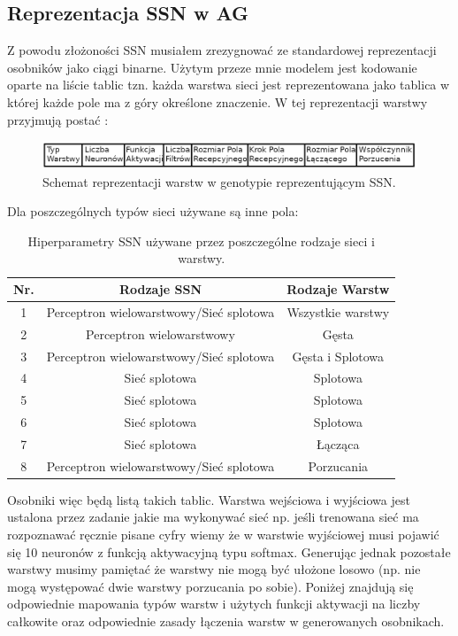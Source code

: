 \documentclass{article}
\begin{document}
\subsection{Reprezentacja SSN w AG}
\label{sec:ossn}
Z powodu złożoności SSN musiałem zrezygnować ze standardowej reprezentacji osobników 
jako ciągi binarne. Użytym przeze mnie modelem jest kodowanie oparte na liście tablic tzn.
każda warstwa sieci jest reprezentowana jako tablica w której każde pole ma z góry określone 
znaczenie. W tej reprezentacji warstwy przyjmują postać \cite{ams}:\\
\begin{figure}[H]
\centering
\includegraphics[scale=0.30]{dnn_genome.png}
\caption{Schemat reprezentacji warstw w genotypie reprezentującym SSN.}
\label{fig:gen}
\end{figure}
Dla poszczególnych typów sieci używane są inne pola:\\
\begin{table}[H]
\centering
\begin{tabular}{|c|c|c|}
	\hline
	Nr. & Rodzaje SSN & Rodzaje Warstw\\
	\hline
	1 & Perceptron wielowarstwowy/Sieć splotowa & Wszystkie warstwy\\
	2 & Perceptron wielowarstwowy & Gęsta\\
	3 & Perceptron wielowarstwowy/Sieć splotowa & Gęsta i Splotowa \\
	4 & Sieć splotowa & Splotowa\\
	5 & Sieć splotowa & Splotowa\\
	6 & Sieć splotowa & Splotowa\\
	7 & Sieć splotowa & Łącząca\\
	8 & Perceptron wielowarstwowy/Sieć splotowa & Porzucania\\
	\hline
\end{tabular}
\caption{\label{tab:zakres}Hiperparametry SSN używane przez poszczególne rodzaje sieci i 
         warstwy.}
\end{table}

Osobniki więc będą listą takich tablic.
Warstwa wejściowa i wyjściowa jest ustalona 
przez zadanie jakie ma wykonywać sieć np. jeśli trenowana sieć ma rozpoznawać ręcznie pisane
cyfry wiemy że w warstwie  wyjściowej musi pojawić się 10 neuronów z funkcją aktywacyjną
typu softmax.
Generując jednak pozostałe warstwy musimy pamiętać że warstwy nie mogą być ułożone losowo
(np. nie mogą występować dwie warstwy porzucania po sobie). Poniżej znajdują się odpowiednie
mapowania typów warstw i użytych funkcji aktywacji na liczby całkowite oraz odpowiednie zasady 
łączenia warstw w generowanych osobnikach.\\
\end{document}
